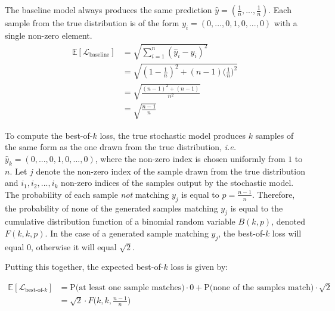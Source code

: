 \documentclass{article}
\begin{document}
\begin{appendices}
  The baseline model always produces the same prediction $\hat{y} = (\frac{1}{n}, ..., \frac{1}{n})$.
  Each sample from the true distribution is of the form $y_i = (0, ..., 0, 1, 0, ..., 0)$ with a single non-zero element.
  \begin{align}
    \mathbb{E}[\mathcal{L}_{\mbox{baseline}}] &= \sqrt{\sum_{i=1}^n (\hat{y}_i - y_i)^2} \\
    &= \sqrt{(1-\frac{1}{n})^2 + (n-1)\Big ( \frac{1}{n} \Big )^2} \\
    &= \sqrt{\frac{(n-1)^2 + (n-1)}{n^2}} \\
    &= \sqrt{\frac{n-1}{n}}
  \end{align}

  To compute the best-of-$k$ loss, the true stochastic model produces $k$ samples of the same form as the one drawn from the true distribution, \emph{i.e.}\ $\hat{y}_k = (0, ..., 0, 1, 0, ..., 0)$, where the non-zero index is chosen uniformly from $1$ to $n$.
  Let $j$ denote the non-zero index of the sample drawn from the true distribution and $i_1, i_2, ..., i_k$ non-zero indices of the samples output by the stochastic model.
  The probability of each sample \emph{not} matching $y_j$ is equal to $p = \frac{n-1}{n}$.
  Therefore, the probability of none of the generated samples matching $y_j$ is equal to the cumulative distribution function of a binomial random variable $B(k, p)$, denoted $F(k, k, p)$.
  In the case of a generated sample matching $y_j$, the best-of-$k$ loss will equal 0, otherwise it will equal $\sqrt{2}$.

  Putting this together, the expected best-of-$k$ loss is given by:

  \begin{align}
    \mathbb{E}[\mathcal{L}_{\mbox{best-of-$k$}}] &= \mbox{P(at least one sample matches)}\cdot 0 + \mbox{P(none of the samples match)} \cdot \sqrt{2} \\
    &= \sqrt{2} \cdot F\Big (k, k, \frac{n-1}{n} \Big) \\
  \end{align}


\end{appendices}
\end{document}
